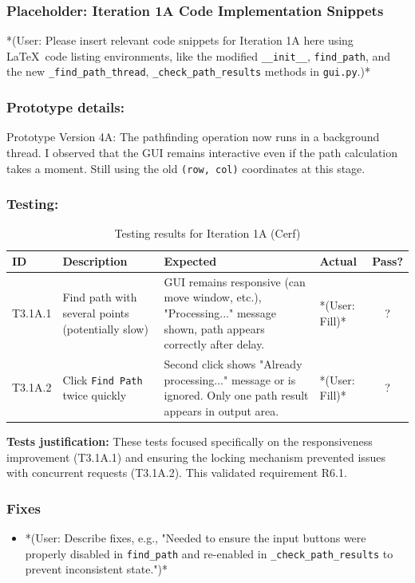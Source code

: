 \newpage
\subsubsection*{Placeholder: Iteration 1A Code Implementation Snippets}
*(User: Please insert relevant code snippets for Iteration 1A here using \LaTeX\ code listing environments, like the modified \verb|__init__|, \verb|find_path|, and the new \verb|_find_path_thread|, \verb|_check_path_results| methods in \verb|gui.py|.)*
\newpage

\subsubsection{Prototype details:}
Prototype Version 4A: The pathfinding operation now runs in a background thread. I observed that the GUI remains interactive even if the path calculation takes a moment. Still using the old \verb|(row, col)| coordinates at this stage.

\subsubsection{Testing:}
\begin{table}[htbp]
	\centering
	\begin{tabularx}{\textwidth}{|l|X|p{4.5cm}|p{1.5cm}|c|}
		\hline
		\textbf{ID} & \textbf{Description} & \textbf{Expected} & \textbf{Actual} & \textbf{Pass?} \\
		\hline
		T3.1A.1 & Find path with several points (potentially slow) & GUI remains responsive (can move window, etc.), "Processing..." message shown, path appears correctly after delay. & *(User: Fill)* & ? \\
		\hline
		T3.1A.2 & Click \verb|Find Path| twice quickly & Second click shows "Already processing..." message or is ignored. Only one path result appears in output area. & *(User: Fill)* & ? \\
		\hline
	\end{tabularx}
	\caption{Testing results for Iteration 1A (Cerf)}
\end{table}
\textbf{Tests justification:} These tests focused specifically on the responsiveness improvement (T3.1A.1) and ensuring the locking mechanism prevented issues with concurrent requests (T3.1A.2). This validated requirement R6.1.

\subsubsection{Fixes}
\begin{itemize}
	\item *(User: Describe fixes, e.g., "Needed to ensure the input buttons were properly disabled in \verb|find_path| and re-enabled in \verb|_check_path_results| to prevent inconsistent state.")*
\end{itemize}

